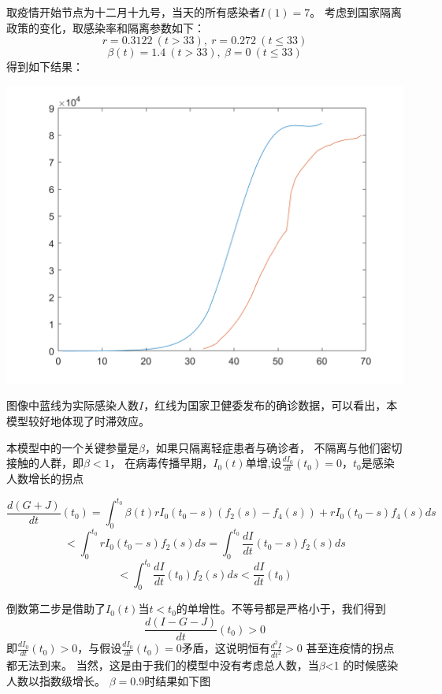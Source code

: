 \documentclass[UTF8]{ctexart}
\begin{document}
				取疫情开始节点为十二月十九号，当天的所有感染者$I(1)=7$。
				考虑到国家隔离政策的变化，取感染率和隔离参数如下：
				$$r=0.3122\ (t>33),\ r=0.272\ (t\leq33)$$
				$$\beta(t)=1.4\ (t>33),\ \beta=0\ (t\leq33)$$
				得到如下结果：
	
				\centerline{\includegraphics[scale=0.3]{1.png}}
				
				
				图像中蓝线为实际感染人数$I$，红线为国家卫健委发布的确诊数据，可以看出，本模型较好地体现了时滞效应。
				
				本模型中的一个关键参量是$\beta$，如果只隔离轻症患者与确诊者，
				不隔离与他们密切接触的人群，即$\beta<1$，
				在病毒传播早期，$I_0(t)$单增,设$\frac{dI_0}{dt}(t_0)=0$，$t_0$是感染人数增长的拐点
				
				$$\frac{d(G+J)}{dt}(t_0)=\int_0^{t_0} \beta(t) rI_0(t_0-s)(f_2(s)-f_4(s))+rI_0(t_0-s)f_4(s) ds$$
				$$< \int_0^{t_0} rI_0(t_0-s)f_2(s)ds=\int_0^{t_0} \frac{dI}{dt}(t_0-s) f_2(s)ds$$
				$$< \int_0^{t_0} \frac{dI}{dt}(t_0) f_2(s) ds < \frac{dI}{dt}(t_0)$$
				
				倒数第二步是借助了$I_0(t)$当$t<t_0$的单增性。不等号都是严格小于，我们得到
				$$\frac{d(I-G-J)}{dt}(t_0)>0$$
				即$\frac{dI_0}{dt}(t_0)>0$，与假设$\frac{dI_0}{dt}(t_0)=0$矛盾，这说明恒有$\frac{d^2I}{dt^2}>0$
				甚至连疫情的拐点都无法到来。
				当然，这是由于我们的模型中没有考虑总人数，当$\beta$<1 的时候感染人数以指数级增长。
				$\beta=0.9$时结果如下图
				
\end{document}
